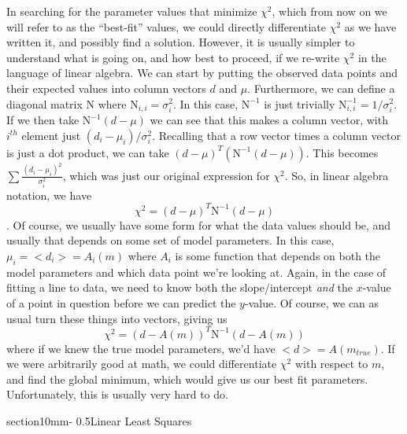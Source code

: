 \documentclass[letterpaper,11pt,preprint]{aastex}
\makeatletter
\renewcommand{\section}{\@startsection%
{section}{1}{0mm}{-\baselineskip}%
{0.5\baselineskip}{\normalfont\Large\bfseries}}%
\makeatother
\begin{document}
{In searching for the parameter values that minimize $\chi^2$, which
from now on we will refer to as the ``best-fit'' values, we could
directly differentiate $\chi^2$ as we have written it, and possibly
find a solution.  However, it is usually simpler to understand what is
going on, and how best to proceed, if we re-write $\chi^2$ in the
language of linear algebra.  We can start by putting the observed data points
and their expected values into column vectors $d$ and $\mu$.  Furthermore, we
can define a diagonal matrix $\mathrm{N}$ where
$\mathrm{N}_{i,i}=\sigma_i^2$.  In this case, $\mathrm{N}^{-1}$ is
just trivially $\mathrm{N}^{-1}_{i,i}=1/\sigma_i^2$.  If we then take
$\mathrm{N}^{-1}(d-\mu)$ we can see that this makes a column vector, with
$i^{th}$ element just $(d_i-\mu_i)/\sigma_i^2$.  Recalling that a row
vector times a column vector is just a dot product, we can take
$(d-\mu)^T \left (\mathrm{N}^{-1} (d-\mu) \right )$.  This becomes
$\sum\frac{(d_i-\mu_i)^2}{\sigma_i^2}$, which was just our original
expression for $\chi^2$.  So, in linear algebra notation, we have 
$$\chi^2=(d-\mu)^T \mathrm{N}^{-1} (d-\mu)$$.
Of course, we usually have some form for what the data values should
be, and usually that depends on some set of model parameters.  In this
case, $\mu_i=<d_i>=A_i(m)$ where $A_i$ is some function that depends
on both the model parameters and which data point we're looking at.
Again, in the case of fitting a line to data, we need to know both the
slope/intercept {\textit{and}} the $x$-value of a point in question
before we can predict the $y$-value.  Of course, we can as usual turn
these things into vectors, giving us 
\begin{equation}\label{eq:nlchisq}
\chi^2=(d-A(m))^T\mathrm{N}^{-1}(d-A(m))
\end{equation}
where if we knew the true model parameters, we'd have
$<d>=A(m_{true})$.  If we were arbitrarily good at math, we could
differentiate $\chi^2$ with respect to $m$, and find the global
minimum, which would give us our best fit parameters.  Unfortunately,
this is usually very hard to do.

\section{Linear Least Squares}

}
\end{document}

